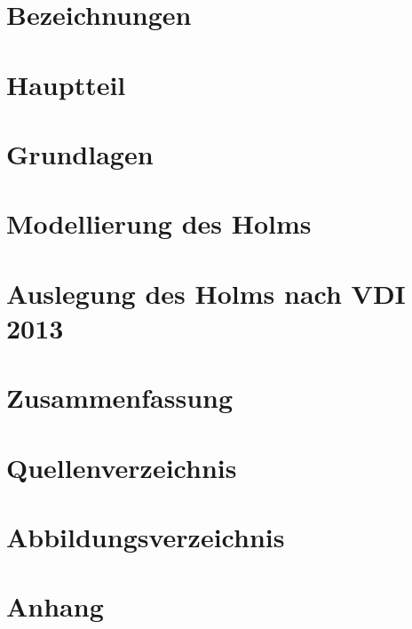 \documentclass[a4paper,twoside,11pt]{article}
\begin{document}



\tableofcontents
\section{Bezeichnungen}

\section{Hauptteil}

\section{Grundlagen}

\section{Modellierung des Holms}

\section{Auslegung des Holms nach VDI 2013}

\section{Zusammenfassung}

\section{Quellenverzeichnis}

\section{Abbildungsverzeichnis}

\section{Anhang}

\end{document}
